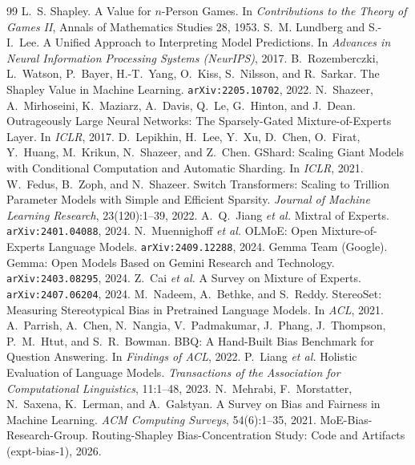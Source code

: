 \documentclass[sigconf]{acmart}
\begin{document}

\begin{thebibliography}{99}
 L.~S. Shapley. A Value for $n$-Person Games. In
  \emph{Contributions to the Theory of Games II}, Annals of Mathematics
  Studies 28, 1953.
 S.~M. Lundberg and S.-I.~Lee. A Unified Approach to
  Interpreting Model Predictions. In \emph{Advances in Neural Information
  Processing Systems (NeurIPS)}, 2017.
 B.~Rozemberczki, L.~Watson, P.~Bayer, H.-T.~Yang,
  O.~Kiss, S.~Nilsson, and R.~Sarkar. The Shapley Value in Machine
  Learning. \texttt{arXiv:2205.10702}, 2022.
 N.~Shazeer, A.~Mirhoseini, K.~Maziarz, A.~Davis,
  Q.~Le, G.~Hinton, and J.~Dean. Outrageously Large Neural Networks: The
  Sparsely-Gated Mixture-of-Experts Layer. In \emph{ICLR}, 2017.
 D.~Lepikhin, H.~Lee, Y.~Xu, D.~Chen, O.~Firat,
  Y.~Huang, M.~Krikun, N.~Shazeer, and Z.~Chen. GShard: Scaling Giant
  Models with Conditional Computation and Automatic Sharding. In
  \emph{ICLR}, 2021.
 W.~Fedus, B.~Zoph, and N.~Shazeer. Switch Transformers:
  Scaling to Trillion Parameter Models with Simple and Efficient Sparsity.
  \emph{Journal of Machine Learning Research}, 23(120):1--39, 2022.
 A.~Q.~Jiang \emph{et al.} Mixtral of Experts.
  \texttt{arXiv:2401.04088}, 2024.
 N.~Muennighoff \emph{et al.} OLMoE: Open
  Mixture-of-Experts Language Models. \texttt{arXiv:2409.12288}, 2024.
 Gemma Team (Google). Gemma: Open Models Based on
  Gemini Research and Technology. \texttt{arXiv:2403.08295}, 2024.
 Z.~Cai \emph{et al.} A Survey on Mixture of Experts.
  \texttt{arXiv:2407.06204}, 2024.
 M.~Nadeem, A.~Bethke, and S.~Reddy. StereoSet: Measuring
  Stereotypical Bias in Pretrained Language Models. In \emph{ACL}, 2021.
 A.~Parrish, A.~Chen, N.~Nangia, V.~Padmakumar,
  J.~Phang, J.~Thompson, P.~M.~Htut, and S.~R.~Bowman. BBQ: A
  Hand-Built Bias Benchmark for Question Answering. In \emph{Findings of
  ACL}, 2022.
 P.~Liang \emph{et al.} Holistic Evaluation of Language
  Models. \emph{Transactions of the Association for Computational
  Linguistics}, 11:1--48, 2023.
 N.~Mehrabi, F.~Morstatter, N.~Saxena, K.~Lerman, and
  A.~Galstyan. A Survey on Bias and Fairness in Machine Learning. \emph{ACM
  Computing Surveys}, 54(6):1--35, 2021.
 MoE-Bias-Research-Group. Routing-Shapley
  Bias-Concentration Study: Code and Artifacts (expt-bias-1), 2026.
\end{thebibliography}
\end{document}
